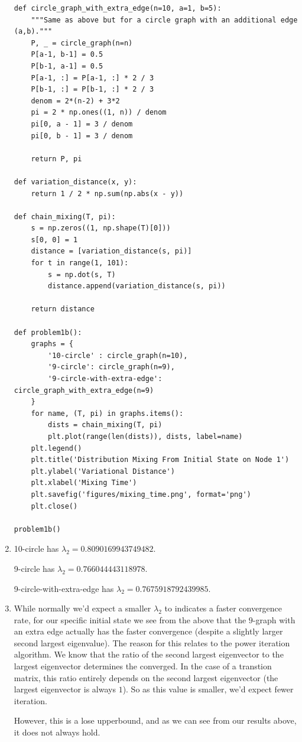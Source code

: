 \documentclass[12pt]{article}
\begin{document}
\begin{enumerate}[label=(\alph*)]
\begin{verbatim}
def circle_graph_with_extra_edge(n=10, a=1, b=5):
    """Same as above but for a circle graph with an additional edge (a,b)."""
    P, _ = circle_graph(n=n)
    P[a-1, b-1] = 0.5
    P[b-1, a-1] = 0.5
    P[a-1, :] = P[a-1, :] * 2 / 3
    P[b-1, :] = P[b-1, :] * 2 / 3
    denom = 2*(n-2) + 3*2
    pi = 2 * np.ones((1, n)) / denom
    pi[0, a - 1] = 3 / denom
    pi[0, b - 1] = 3 / denom
    
    return P, pi

def variation_distance(x, y):
    return 1 / 2 * np.sum(np.abs(x - y))

def chain_mixing(T, pi):
    s = np.zeros((1, np.shape(T)[0]))
    s[0, 0] = 1
    distance = [variation_distance(s, pi)]
    for t in range(1, 101):
        s = np.dot(s, T)
        distance.append(variation_distance(s, pi))
        
    return distance

def problem1b():
    graphs = {
        '10-circle' : circle_graph(n=10),
        '9-circle': circle_graph(n=9),
        '9-circle-with-extra-edge': circle_graph_with_extra_edge(n=9)
    }
    for name, (T, pi) in graphs.items():
        dists = chain_mixing(T, pi)
        plt.plot(range(len(dists)), dists, label=name)
    plt.legend()
    plt.title('Distribution Mixing From Initial State on Node 1')
    plt.ylabel('Variational Distance')
    plt.xlabel('Mixing Time')
    plt.savefig('figures/mixing_time.png', format='png')
    plt.close()

problem1b()
  \end{verbatim}
  
  \item
    10-circle has $\lambda_2=0.8090169943749482$.

    9-circle has $\lambda_2=0.766044443118978$.

    9-circle-with-extra-edge has $\lambda_2=0.7675918792439985$.

  \item
     While normally we'd expect a smaller $\lambda_2$ to indicates a faster convergence rate, for our specific initial state we see from the above that the $9$-graph with an extra edge actually has the faster convergence (despite a slightly larger second largest eigenvalue). The reason for this relates to the power iteration algorithm. We know that the ratio of the second largest eigenvector to the largest eigenvector determines the converged. In the case of a transtion matrix, this ratio entirely depends on the second largest eigenvector (the largest eigenvector is always $1$). So as this value is smaller, we'd expect fewer iteration. 

     However, this is a lose upperbound, and as we can see from our results above, it does not always hold. 
\end{enumerate}
\end{document}

